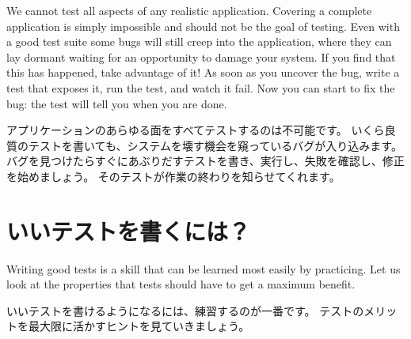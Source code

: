 \documentclass[a4paper,10pt,twoside]{book}
\begin{document}
We cannot test all aspects of any realistic application.
Covering a complete application is simply impossible and should not be the
goal of testing. 
Even with a good test suite
some bugs will still creep into the application, where they can lay dormant
waiting for an opportunity to damage your system.  
If you find that this has happened, take advantage of it!
As soon as you uncover the bug, write a test that exposes it, run the test, and watch it fail.
Now you can start to fix the bug: the test will tell you when you are done.
\fi

アプリケーションのあらゆる面をすべてテストするのは不可能です。
いくら良質のテストを書いても、システムを壊す機会を窺っているバグが入り込みます。
バグを見つけたらすぐにあぶりだすテストを書き、実行し、失敗を確認し、修正を始めましょう。
そのテストが作業の終わりを知らせてくれます。

\section{いいテストを書くには？}

Writing good tests is a skill that can be learned most easily by
practicing.  Let us look at the properties that tests should have to
get a maximum benefit.
\fi

いいテストを書けるようになるには、練習するのが一番です。
テストのメリットを最大限に活かすヒントを見ていきましょう。
\end{document}
